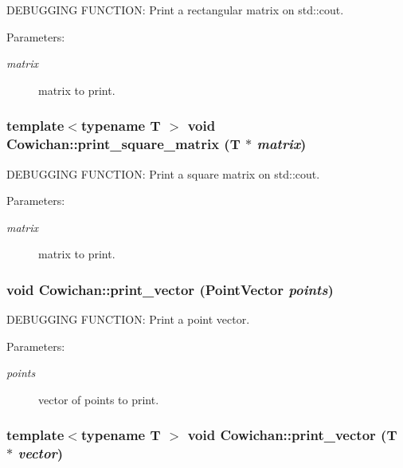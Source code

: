 DEBUGGING FUNCTION: Print a rectangular matrix on std::cout. \begin{Desc}
\item[Parameters:]
\begin{description}
\item[{\em matrix}]matrix to print. \end{description}
\end{Desc}
\hypertarget{class_cowichan_e8fdfb7dd3e8be0a7e9dbc531b1298d2}{
\subsubsection[{print\_\-square\_\-matrix}]{\setlength{\rightskip}{0pt plus 5cm}template$<$typename T $>$ void Cowichan::print\_\-square\_\-matrix (T $\ast$ {\em matrix})}}
\label{class_cowichan_e8fdfb7dd3e8be0a7e9dbc531b1298d2}


DEBUGGING FUNCTION: Print a square matrix on std::cout. \begin{Desc}
\item[Parameters:]
\begin{description}
\item[{\em matrix}]matrix to print. \end{description}
\end{Desc}
\hypertarget{class_cowichan_3b974ae1693ac661fb079b28981ca885}{
\subsubsection[{print\_\-vector}]{\setlength{\rightskip}{0pt plus 5cm}void Cowichan::print\_\-vector ({\bf PointVector} {\em points})}}
\label{class_cowichan_3b974ae1693ac661fb079b28981ca885}


DEBUGGING FUNCTION: Print a point vector. \begin{Desc}
\item[Parameters:]
\begin{description}
\item[{\em points}]vector of points to print. \end{description}
\end{Desc}
\hypertarget{class_cowichan_90f1155f5c35308796b142b15d681a4b}{
\subsubsection[{print\_\-vector}]{\setlength{\rightskip}{0pt plus 5cm}template$<$typename T $>$ void Cowichan::print\_\-vector (T $\ast$ {\em vector})}}
\label{class_cowichan_90f1155f5c35308796b142b15d681a4b}


